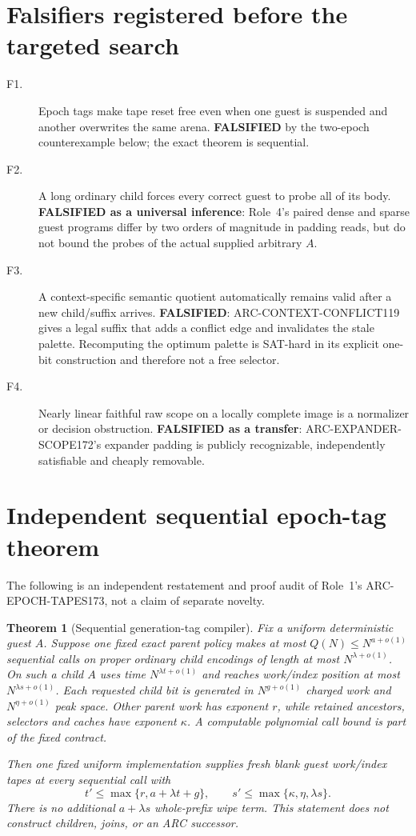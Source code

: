 \documentclass[11pt]{article}
\newtheorem{theorem}{Theorem}
\begin{document}
\section{Falsifiers registered before the targeted search}
\begin{description}
\item[F1.] Epoch tags make tape reset free even when one guest is suspended
and another overwrites the same arena.  \textbf{FALSIFIED} by the two-epoch
counterexample below; the exact theorem is sequential.
\item[F2.] A long ordinary child forces every correct guest to probe all of
its body.  \textbf{FALSIFIED as a universal inference}: Role~4's paired dense
and sparse guest programs differ by two orders of magnitude in padding reads,
but do not bound the probes of the actual supplied arbitrary $A$.
\item[F3.] A context-specific semantic quotient automatically remains valid
after a new child/suffix arrives.  \textbf{FALSIFIED}: ARC-CONTEXT-CONFLICT119
gives a legal suffix that adds a conflict edge and invalidates the stale
palette.  Recomputing the optimum palette is SAT-hard in its explicit
one-bit construction and therefore not a free selector.
\item[F4.] Nearly linear faithful raw scope on a locally complete image is a
normalizer or decision obstruction.  \textbf{FALSIFIED as a transfer}:
ARC-EXPANDER-SCOPE172's expander padding is publicly recognizable,
independently satisfiable and cheaply removable.
\end{description}

\section{Independent sequential epoch-tag theorem}
The following is an independent restatement and proof audit of Role~1's
ARC-EPOCH-TAPES173, not a claim of separate novelty.

\begin{theorem}[Sequential generation-tag compiler]\label{th:seq}
Fix a uniform deterministic guest $A$.  Suppose one fixed exact parent policy
makes at most $Q(N)\le N^{a+o(1)}$ sequential calls on proper ordinary child
encodings of length at most $N^{\lambda+o(1)}$.  On such a child $A$ uses time
$N^{\lambda t+o(1)}$ and reaches work/index position at most
$N^{\lambda s+o(1)}$.  Each requested child bit is generated in
$N^{g+o(1)}$ charged work and $N^{\eta+o(1)}$ peak space.  Other parent work
has exponent $r$, while retained ancestors, selectors and caches have exponent
$\kappa$.  A computable polynomial call bound is part of the fixed contract.

Then one fixed uniform implementation supplies fresh blank guest work/index
tapes at every sequential call with
\[
 t'\le\max\{r,a+\lambda t+g\},\qquad
 s'\le\max\{\kappa,\eta,\lambda s\}.
\]
There is no additional $a+\lambda s$ whole-prefix wipe term.  This statement
does not construct children, joins, or an ARC successor.
\end{theorem}
\end{document}
